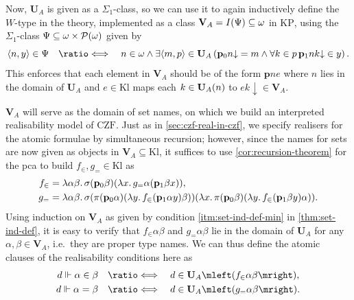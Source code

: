 \documentclass[12pt,openany]{book}
\theoremstyle{plain}
\theoremstyle{definition}
\newcommand\tuple[1]{\left\langle #1 \right\rangle}
\newcommand\opA[1]{\mathop{\forall #1}}
\newcommand\opE[1]{\mathop{\exists #1}}
\newcommand\oplam[1]{\mathop{\lambda #1.}}
\newcommand\defeqv{\quad \ratio\Longleftrightarrow \quad}
\newcommand\Pow{\mathcal{P}}
\newcommand\KP{\mathrm{KP}}
\newcommand\CZF{\mathrm{CZF}}
\newcommand\Kl{\mathrm{Kl}}
\newcommand\bp{\mathbf{p}}
\newcommand\bU{\mathbf{U}}
\newcommand\bV{\mathbf{V}}
\begin{document}
Now, $\bU_A$ is given as a $\Sigma_1$-class, so we can use it to again inductively define the $W$-type in the theory, implemented as a class $\bV_A = I\mleft(\Psi\mright) \subseteq \omega$ in $\KP$, using the $\Sigma_1$-class $\Psi \subseteq \omega \times \Pow\mleft(\omega\mright)$ given by
\[\tuple{n, y} \in \Psi \defeqv n \in \omega \land \opE{{\tuple{m, p} \in \bU_A}} \left(\bp_0 n {\downarrow} = m \land \opA{k \in p} \bp_1 nk {\downarrow} \in y\right).\]
This enforces that each element in $\bV_A$ should be of the form $\bp ne$ where $n$ lies in the domain of $\bU_A$ and $e \in \Kl$ maps each $k \in \bU_A\mleft(n\mright)$ to $ek {\downarrow} \in \bV_A$.

$\bV_A$ will serve as the domain of set names, on which we build an interpreted realisability model of $\CZF$. Just as in \autoref{sec:czf-real-in-czf}, we specify realisers for the atomic formulae by simultaneous recursion; however, since the names for sets are now given as objects in $\bV_A \subseteq \Kl$, it suffices to use \autoref{cor:recursion-theorem} for the pca to build $f_\in, g_= \in \Kl$ as
\begin{align*}
  f_\in & = \oplam{\alpha \beta} \sigma \mleft(\bp_0 \beta\mright) \mleft(\oplam{x} g_= \alpha \mleft(\bp_1 \beta x\mright)\mright),                                                                                                                                                  \\
  g_=   & = \oplam{\alpha \beta} \sigma \mleft(\pi \mleft(\bp_0 \alpha\mright) \mleft(\oplam{y} f_\in \mleft(\bp_1 \alpha y\mright) \beta\mright)\mright) \mleft(\oplam{x} \pi \mleft(\bp_0 \beta\mright) \mleft(\oplam{y} f_\in \mleft(\bp_1 \beta y\mright) \alpha\mright)\mright).
\end{align*}
Using induction on $\bV_A$ as given by condition \ref{itm:set-ind-def-min} in \autoref{thm:set-ind-def}, it is easy to verify that $f_\in \alpha \beta$ and $g_= \alpha \beta$ lie in the domain of $\bU_A$ for any $\alpha, \beta \in \bV_A$, i.e.\ they are proper type names. We can thus define the atomic clauses of the realisability conditions here as
\begin{align*}
  d \Vdash \alpha \in \beta & \defeqv d \in \bU_A\mleft(f_\in \alpha \beta\mright), \\
  d \Vdash \alpha = \beta   & \defeqv d \in \bU_A\mleft(g_= \alpha \beta\mright).
\end{align*}
\end{document}

